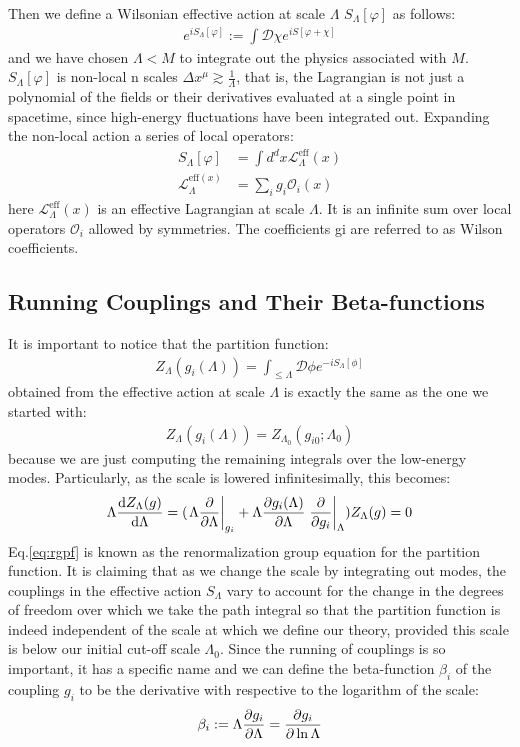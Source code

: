 Then we define a Wilsonian effective action at scale $\Lambda$ $S_{\Lambda}[\varphi]$ as follows:
\begin{align}
    e^{iS_{\Lambda}[\varphi]} := \int \mathcal{D}\chi e^{iS[\varphi + \chi]}
\end{align}
and we have chosen $\Lambda < M$ to integrate out the physics associated with $M$. $S_{\Lambda} [\varphi]$ is non-local n scales $\Delta x^{\mu} \gtrsim \frac{1}{\Lambda}$, that is, the Lagrangian is not just a polynomial of the fields or their derivatives evaluated at a single point in spacetime, since high-energy fluctuations have been integrated out. Expanding the non-local action a series of local operators:
\begin{align}
    S_{\Lambda} [\varphi] &= \int d^{d}x \mathcal{L}_{\Lambda}^{\text{eff}}(x) \\
    \mathcal{L}_{\Lambda}^{\text{eff}(x)} &= \sum_{i} g_{i}\mathcal{O}_{i}(x)
\end{align}
here $\mathcal{L}_{\Lambda}^{\text{eff}}(x)$ is an effective Lagrangian at scale $\Lambda$.  It is an infinite sum over local operators $\mathcal{O}_{i}$ allowed by symmetries. The coefficients gi are referred to as Wilson coefficients.
\subsection{Running Couplings and Their Beta-functions}
It is important to notice that the partition function:
\begin{align}
    Z_{\Lambda} (g_{i} (\Lambda)) = \int _{\le \Lambda} \mathcal{D} \phi e^{-iS_{\Lambda}[\phi]}
\end{align}
obtained from the effective action at scale $\Lambda$ is exactly the same as the one we started with:
\begin{align}
    Z_{\Lambda}(g_{i}(\Lambda)) = Z_{\Lambda_{0}}(g_{i0};\Lambda_{0})
\end{align}
because we are just computing the remaining integrals over the low-energy modes. Particularly, as the scale is lowered infinitesimally, this becomes:
\begin{align}
    \label{eq:rgpf}
    \Lambda\dv{Z_{\Lambda}(g)}{\Lambda} = (\eval{\Lambda \pdv{\Lambda}}_{g_{i}} + \Lambda\pdv{g_{i}(\Lambda)}{\Lambda} \eval{\pdv{g_{i}}}_{\Lambda})Z_{\Lambda}(g) = 0
\end{align}
Eq.\ref{eq:rgpf} is known as the renormalization group equation for the partition function. It is claiming that as we change the scale by integrating out modes, the couplings in the effective action $S_{\Lambda}$ vary to account for the change in the degrees of freedom over which we take the path integral so that the partition function is indeed independent of the scale at which we define our theory, provided this scale is below our initial cut-off scale $\Lambda_{0}$. Since the running of couplings is so important, it has a specific name and we can define the beta-function $\beta _{i}$ of the coupling $g_{i}$ to be the derivative with respective to the logarithm of the scale:
\begin{align}
    \beta_{i} := \Lambda\pdv{g_{i}}{\Lambda} = \pdv{g_{i}}{\ln \Lambda}
\end{align}


